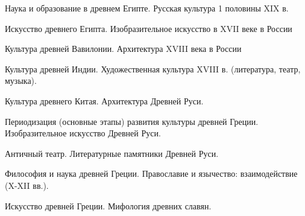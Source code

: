\z Наука и образование в древнем Египте.
 \medskip
\z Русская культура 1 половины XIX в.
 \medskip

\newpage


\shapkFull
\setcounter{zad}{0}

\z Искусство древнего Египта.
 \medskip
\z Изобразительное искусство в XVII веке в России
 \medskip

\newpage


\shapkFull
\setcounter{zad}{0}

\z Культура древней Вавилонии.
 \medskip
\z Архитектура XVIII века в России
 \medskip

\newpage


\shapkFull
\setcounter{zad}{0}

\z Культура древней Индии.
 \medskip
\z Художественная культура XVIII в. (литература, театр, музыка).
 \medskip

\newpage


\shapkFull
\setcounter{zad}{0}

\z Культура древнего Китая.
 \medskip
\z Архитектура Древней Руси.
 \medskip

\newpage


\shapkFull
\setcounter{zad}{0}

\z Периодизация (основные этапы) развития культуры древней Греции.
 \medskip
\z Изобразительное искусство Древней Руси.
 \medskip

\newpage


\shapkFull
\setcounter{zad}{0}

\z Античный театр.
 \medskip
\z Литературные памятники Древней Руси.
 \medskip

\newpage


\shapkFull
\setcounter{zad}{0}

\z Философия и наука древней Греции.
 \medskip
\z Православие и язычество: взаимодействие (X-XII вв.).
 \medskip

\newpage


\shapkFull
\setcounter{zad}{0}

\z Искусство древней Греции.
 \medskip
\z Мифология древних славян.
 \medskip

